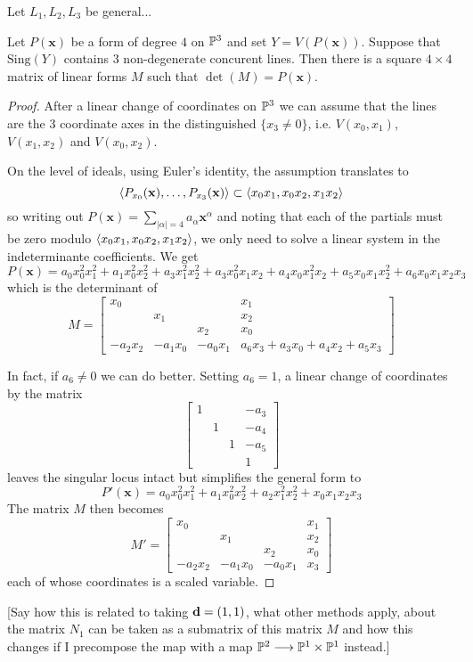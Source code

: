 \documentclass[fleqn,reqno]{amsart}
\numberwithin{first}{chapter}
\begin{document}
\begin{lemma}
Let $L_1,L_2,L_3$ be general...
\end{lemma}

\begin{lemma}[$\mt{ex10}$]
\label{lucky-comp}
Let $P(\mathbf x)$ be a form of degree $4$ on $\mathbb{P}^3$ and set $Y=V(P(\mathbf x))$.
Suppose that $\mathrm{Sing}(Y)$ contains 3 non-degenerate concurent lines.
Then there is a square $4\times4$ matrix of linear forms $M$ such that $\det(M)=P(\mathbf x)$.
\end{lemma}

\begin{proof}
After a linear change of coordinates on $\mathbb{P}^3$ we can assume that the lines are the
3 coordinate axes in the distinguished $\{x_3\neq0\}$, i.e. $V(x_0,x_1)$, $V(x_1,x_2)$ and $V(x_0,x_2)$.

On the level of ideals, using Euler's identity, the assumption translates to
\[
\langle P_{x_0}(\mathbf x),\ldots, P_{x_3}(\mathbf x) \rangle\subset\langle x_0x_1,x_0x_2,x_1x_2\rangle
\]
so writing out $P(\mathbf x)=\sum_{|\alpha|=4} a_\alpha {\mathbf x}^\alpha$
and noting that each of the partials must be zero modulo $\langle x_0x_1,x_0x_2,x_1x_2\rangle$,
we only need to solve a linear system in the indeterminante coefficients.
We get
\[
P(\mathbf x)=
a_0x_0^2x_1^2+a_1x_0^2x_2^2+a_3x_1^2x_2^2+a_3x_0^2x_1x_2+a_4x_0x_1^2x_2+a_5x_0x_1x_2^2+a_6x_0x_1x_2x_3
\]
which is the determinant of
\[
M=\begin{bmatrix}
x_0&&&x_1\\
&x_1&&x_2\\
&&x_2&x_0\\
-a_2x_2&-a_1x_0&-a_0x_1&a_6x_3+a_3x_0+a_4x_2+a_5x_3
\end{bmatrix}
\]

In fact, if $a_6\neq0$ we can do better.
Setting $a_6=1$, a linear change of coordinates by the matrix
\[
\begin{bmatrix}
1&&&-a_3\\
&1&&-a_4\\
&&1&-a_5\\
&&&1
\end{bmatrix}
\]
leaves the singular locus intact but simplifies the general form to
\[
P'(\mathbf x)=a_0x_0^2x_1^2+a_1x_0^2x_2^2+a_2x_1^2x_2^2+x_0x_1x_2x_3
\]
The matrix $M$ then becomes
\[
M'=\begin{bmatrix}
x_0&&&x_1\\
&x_1&&x_2\\
&&x_2&x_0\\
-a_2x_2&-a_1x_0&-a_0x_1&x_3
\end{bmatrix}
\]
each of whose coordinates is a scaled variable.
\end{proof}

[Say how this is related to taking $\mathbf d=(1,1)$, what other methods apply, about the matrix $N_1$
can be taken as a submatrix of this matrix $M$ and how this changes if I precompose the map with
a map $\mathbb{P}^2\longrightarrow\mathbb{P}^1\times\mathbb{P}^1$ instead.]





\end{document}
